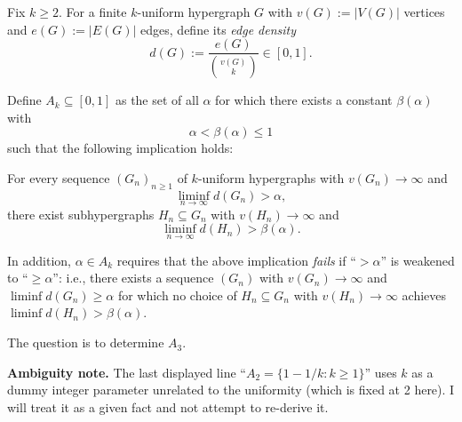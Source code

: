 Fix $k\ge 2$.
For a finite $k$-uniform hypergraph $G$ with $v(G):=|V(G)|$ vertices and $e(G):=|E(G)|$ edges, define its \emph{edge density}
\[
d(G):=\frac{e(G)}{\binom{v(G)}{k}}\in[0,1].
\]

Define $A_k\subseteq[0,1]$ as the set of all $\alpha$ for which there exists a constant $\beta(\alpha)$ with
\[
\alpha<\beta(\alpha)\le 1
\]
such that the following implication holds:

\quad For every sequence $(G_n)_{n\ge 1}$ of $k$-uniform hypergraphs with $v(G_n)\to\infty$ and
\[
\liminf_{n\to\infty} d(G_n) > \alpha,
\]
there exist subhypergraphs $H_n\subseteq G_n$ with $v(H_n)\to\infty$ and
\[
\liminf_{n\to\infty} d(H_n) > \beta(\alpha).
\]

In addition, $\alpha\in A_k$ requires that the above implication \emph{fails} if ``$>\alpha$'' is weakened to ``$\ge\alpha$'': i.e., there exists a sequence $(G_n)$ with $v(G_n)\to\infty$ and $\liminf d(G_n)\ge \alpha$ for which no choice of $H_n\subseteq G_n$ with $v(H_n)\to\infty$ achieves $\liminf d(H_n)>\beta(\alpha)$.

The question is to determine $A_3$.

\textbf{Ambiguity note.} The last displayed line ``$A_2=\{1-1/k:k\ge 1\}$'' uses $k$ as a dummy integer parameter unrelated to the uniformity (which is fixed at 2 here). I will treat it as a given fact and not attempt to re-derive it.
